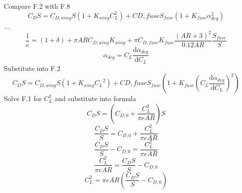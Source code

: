 \documentclass{article}
\begin{document}
Compare F.2 with F.8
\[
\tag{F.2}
C_D S=C_{D,wing}S(1+K_{wing}C_L^2)+C{D,fuse}S_{fuse}\left(1+K_{fuse}\alpha_{deg}^2\right)
\]
...
\[
\tag{F.8}
\frac{1}{e}=(1+\delta)+\pi AR C_{D,wing}K_{wing}+\pi C_{D,fuse}K_{fuse}\frac{(AR+3)^2}{0.12 AR}\frac{S_{fuse}}{S}
\]
\[
\alpha_{deg} = C_L\frac{\mathrm{d}\alpha_{deg}}{\mathrm{d}C_L}
\]
Substitute into F.2
\[
C_D S=C_{D,wing}S(1+K_{wing}{C_L}^2)+C{D,fuse}S_{fuse}\left(1+K_{fuse}\left({C_L\frac{\mathrm{d}\alpha_{deg}}{\mathrm{d}C_L}}\right)^2\right)
\]
Solve F.1 for $C_L^2$ and substitute into formula
\[
\tag{F.1}
C_D S = \left(C_{D,0}+\frac{C_L^2}{\pi eAR}\right)S
\]
\[
\frac{C_D S}{S} = C_{D,0}+\frac{C_L^2}{\pi eAR}
\]
\[
\frac{C_D S}{S}-C_{D,0} = \frac{C_L^2}{\pi eAR}
\]
\[
\frac{C_L^2}{\pi eAR} = \frac{C_D S}{S}-C_{D,0}
\]
\[
C_L^2 = {\pi eAR}\left(\frac{C_D S}{S}-C_{D,0}\right)
\]
\end{document}
